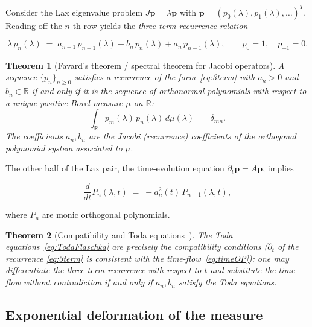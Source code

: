 \documentclass[12pt,a4paper]{article}
\newtheorem{theorem}{Theorem}[section]
\theoremstyle{definition}
\newcommand{\R}{\mathbb{R}}
\begin{document}
Consider the Lax eigenvalue problem $J\mathbf{p} = \lambda\mathbf{p}$
with $\mathbf{p}=(p_0(\lambda),p_1(\lambda),\ldots)^T$.  Reading off the
$n$-th row yields the \emph{three-term recurrence relation}

\begin{equation}\label{eq:3term}
  \lambda\,p_n(\lambda)
  \;=\; a_{n+1}\,p_{n+1}(\lambda) + b_n\,p_n(\lambda) + a_n\,p_{n-1}(\lambda),
  \qquad p_0=1,\quad p_{-1}=0.
\end{equation}

\begin{theorem}[Favard's theorem / spectral theorem for Jacobi operators]
A sequence $\{p_n\}_{n\geq 0}$ satisfies a recurrence of
the form~\eqref{eq:3term} with $a_n>0$ and $b_n\in\R$ if and only if it
is the sequence of orthonormal polynomials with respect to a unique
positive Borel measure $\mu$ on $\R$:
\begin{equation}\label{eq:ortho}
  \int_{\R} p_m(\lambda)\,p_n(\lambda)\,d\mu(\lambda) \;=\; \delta_{mn}.
\end{equation}
The coefficients $a_n,b_n$ are the \emph{Jacobi (recurrence) coefficients}
of the orthogonal polynomial system associated to $\mu$.
\end{theorem}

The other half of the Lax pair, the time-evolution equation
$\partial_t \mathbf{p} = A\mathbf{p}$, implies

\begin{equation}\label{eq:timeOP}
  \frac{d}{dt}P_n(\lambda,t) \;=\; -a_n^2(t)\,P_{n-1}(\lambda,t),
\end{equation}

where $P_n$ are monic orthogonal polynomials.

\begin{theorem}[Compatibility and Toda equations~\cite{Miller2018,Zhedanov2022}]
The Toda equations~\eqref{eq:TodaFlaschka} are precisely the compatibility
conditions ($\partial_t$ of the recurrence \eqref{eq:3term} is consistent
with the time-flow~\eqref{eq:timeOP}): one may differentiate the three-term
recurrence with respect to $t$ and substitute the time-flow without
contradiction if and only if $a_n,b_n$ satisfy the Toda equations.
\end{theorem}

\subsection{Exponential deformation of the measure}
\end{document}
